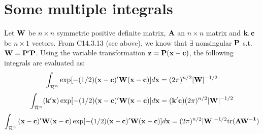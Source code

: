 \documentclass[a4paper, oneside]{book}
\begin{document}
\section{Some multiple integrals}
Let $\mathbf W$ be $n\times n$ symmetric positive definite matrix, $\mathbf A$ an $n\times n$ matrix and $\mathbf{k,c}$ be $n\times 1$ vectors. From C14.3.13 (see above), we know that $\exists$ nonsingular $\mathbf P$ s.t. $\mathbf{W=P'P}$. Using the variable transformation $\mathbf{z=P(x-c)}$, the following integrals are evaluated as:
%
$$\int_{\mathcal{R}^n}\exp[-(1/2)\mathbf{(x-c)'W(x-c)}]d\mathbf{x} = (2\pi)^{n/2} |\mathbf{W}|^{-1/2}$$
%
$$\int_{\mathcal{R}^n}(\mathbf{k'x})\exp [-(1/2)\mathbf{(x-c)'W(x-c)}] d\mathbf{x} = (\mathbf{k'c})(2\pi)^{n/2} |\mathbf{W}|^{-1/2}$$
$$\int_{\mathcal{R}^n}\mathbf{(x-c)'W(x-c)} \exp [-(1/2)\mathbf{(x-c)'W(x-c)}]  d\mathbf{x}  = (2\pi)^{n/2} |\mathbf{W}|^{-1/2}\text{tr}(\mathbf{AW^{-1}}) $$
\end{document}

